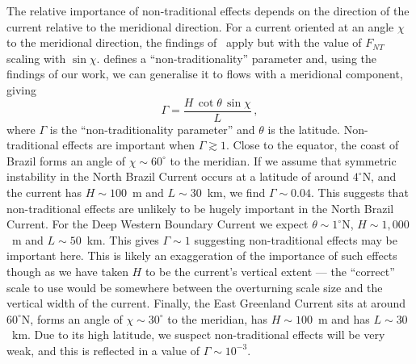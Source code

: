     The relative importance of non-traditional effects depends on the direction of the current relative to the meridional direction. For a current oriented at an angle $\chi$ to the meridional direction, the findings of~\citet{Zeitlin2018a} apply but with the value of $F_{NT}$ scaling with $\sin \chi$. \citet{Zeitlin2018a} defines a ``non-traditionality'' parameter and, using the findings of our work, we can generalise it to flows with a meridional component, giving
    \begin{equation}
        \Gamma = \frac{H\,\cot\theta\,\sin \chi}{L} \, ,
    \end{equation}
    where $\Gamma$ is the  ``non-traditionality parameter'' and $\theta$ is the latitude. Non-traditional effects are important when $\Gamma \gtrsim 1$. Close to the equator, the coast of Brazil forms an angle of $\chi \sim 60^\circ$ to the meridian. If we assume that symmetric instability in the North Brazil Current occurs at a latitude of around $4^\circ$N\footnotemark, and the current has $H\sim100$~m and $L\sim30$~km, we find $\Gamma \sim 0.04$.
    This suggests that non-traditional effects are unlikely to be hugely important in the North Brazil Current. For the Deep Western Boundary Current we expect $\theta \sim 1^\circ$N, $H\sim 1,000$~m and $L \sim 50$~km. This gives $\Gamma \sim 1$ suggesting non-traditional effects may be important here. This is likely an exaggeration of the importance of such effects though as we have taken $H$ to be the current's vertical extent --- the ``correct'' scale to use would be somewhere between the overturning scale size and the vertical width of the current. Finally, the East Greenland Current sits at around $60^\circ$N, forms an angle of $\chi \sim 30^\circ$ to the meridian, has $H \sim 100$~m and has $L \sim 30$~km. Due to its high latitude, we suspect non-traditional effects will be very weak, and this is reflected in a value of $\Gamma \sim 10^{-3}$.

